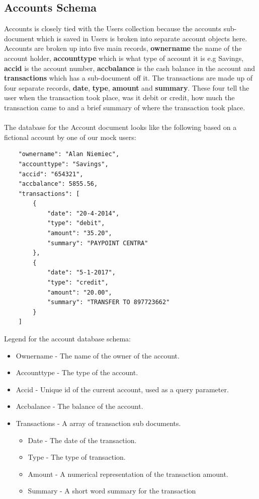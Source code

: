  \subsection{Accounts Schema}
 Accounts is closely tied with the Users collection because the accounts sub-document which is saved in Users is broken into separate account objects here. Accounts are broken up into five main records, \textbf{ownername} the name of the account holder, \textbf{accounttype} which is what type of account it is e.g Savings, \textbf{accid} is the account number, \textbf{accbalance} is the cash balance in the account and \textbf{transactions} which has a sub-document off it. The transactions are made up of four separate records, \textbf{date}, \textbf{type}, \textbf{amount} and \textbf{summary}. These four tell the user when the transaction took place, was it debit or credit, how much the transaction came to and a brief summary of where the transaction took place.\paragraph{}

The database for the Account document looks like the following based on a fictional account by one of our mock users:
\begin{verbatim}
    "ownername": "Alan Niemiec",
    "accounttype": "Savings",
    "accid": "654321",
    "accbalance": 5855.56,
    "transactions": [
        {
            "date": "20-4-2014",
            "type": "debit",
            "amount": "35.20",
            "summary": "PAYPOINT CENTRA"
        },
        {
            "date": "5-1-2017",
            "type": "credit",
            "amount": "20.00",
            "summary": "TRANSFER TO 897723662"
        }
    ]
\end{verbatim}

Legend for the account database schema:
\begin{itemize}
    \item Ownername - The name of the owner of the account.
    \item Accounttype - The type of the account.
    \item Accid - Unique id of the current account, used as a query parameter.
    \item Accbalance - The balance of the account.
    \item Transactions - A array of transaction sub documents.
        \begin{itemize}
            \item Date - The date of the transaction.
            \item Type - The type of transaction.
            \item Amount - A numerical representation of the transaction amount.
            \item Summary - A short word summary for the transaction
        \end{itemize}
\end{itemize}



